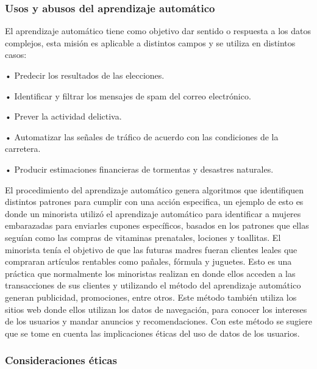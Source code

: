 \documentclass[
  letterpaper,
  DIV=11,
  numbers=noendperiod]{scrartcl}
\begin{document}
\hypertarget{usos-y-abusos-del-aprendizaje-automuxe1tico}{%
\subsubsection{Usos y abusos del aprendizaje
automático}\label{usos-y-abusos-del-aprendizaje-automuxe1tico}}

El aprendizaje automático tiene como objetivo dar sentido o respuesta a
los datos complejos, esta misión es aplicable a distintos campos y se
utiliza en distintos casos:

• Predecir los resultados de las elecciones.

• Identificar y filtrar los mensajes de spam del correo electrónico.

• Prever la actividad delictiva.

• Automatizar las señales de tráfico de acuerdo con las condiciones de
la carretera.

• Producir estimaciones financieras de tormentas y desastres naturales.

El procedimiento del aprendizaje automático genera algoritmos que
identifiquen distintos patrones para cumplir con una acción especifica,
un ejemplo de esto es donde un minorista utilizó el aprendizaje
automático para identificar a mujeres embarazadas para enviarles cupones
específicos, basados en los patrones que ellas seguían como las compras
de vitaminas prenatales, lociones y toallitas. El minorista tenía el
objetivo de que las futuras madres fueran clientes leales que compraran
artículos rentables como pañales, fórmula y juguetes. Esto es una
práctica que normalmente los minoristas realizan en donde ellos acceden
a las transacciones de sus clientes y utilizando el método del
aprendizaje automático generan publicidad, promociones, entre otros.
Este método también utiliza los sitios web donde ellos utilizan los
datos de navegación, para conocer los intereses de los usuarios y mandar
anuncios y recomendaciones. Con este método se sugiere que se tome en
cuenta las implicaciones éticas del uso de datos de los usuarios.

\hypertarget{consideraciones-uxe9ticas}{%
\subsubsection{Consideraciones éticas}\label{consideraciones-uxe9ticas}}
\end{document}
